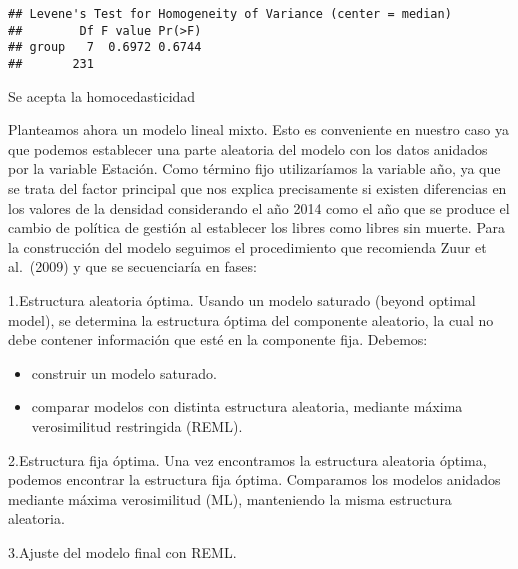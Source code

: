 \documentclass[
]{article}
\begin{document}
\begin{verbatim}
## Levene's Test for Homogeneity of Variance (center = median)
##        Df F value Pr(>F)
## group   7  0.6972 0.6744
##       231
\end{verbatim}

Se acepta la homocedasticidad

Planteamos ahora un modelo lineal mixto. Esto es conveniente en nuestro
caso ya que podemos establecer una parte aleatoria del modelo con los
datos anidados por la variable Estación. Como término fijo utilizaríamos
la variable año, ya que se trata del factor principal que nos explica
precisamente si existen diferencias en los valores de la densidad
considerando el año 2014 como el año que se produce el cambio de
política de gestión al establecer los libres como libres sin muerte.
Para la construcción del modelo seguimos el procedimiento que recomienda
Zuur et al.~(2009) y que se secuenciaría en fases:

1.Estructura aleatoria óptima. Usando un modelo saturado (beyond optimal
model), se determina la estructura óptima del componente aleatorio, la
cual no debe contener información que esté en la componente fija.
Debemos:

\begin{itemize}
\item
  construir un modelo saturado.
\item
  comparar modelos con distinta estructura aleatoria, mediante máxima
  verosimilitud restringida (REML).
\end{itemize}

2.Estructura fija óptima. Una vez encontramos la estructura aleatoria
óptima, podemos encontrar la estructura fija óptima. Comparamos los
modelos anidados mediante máxima verosimilitud (ML), manteniendo la
misma estructura aleatoria.

3.Ajuste del modelo final con REML.
\end{document}
